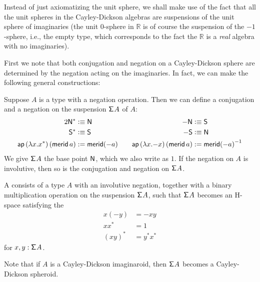 Instead of just axiomatizing the unit sphere, we shall make use of the
fact that all the unit spheres in the Cayley-Dickson algebras are
suspensions of the unit sphere of imaginaries (the unit $0$-sphere in
$\mathbb R$ is of course the suspension of the $-1$-sphere, i.e., the
empty type, which corresponds to the fact the $\mathbb R$ is a
\emph{real} algebra with no imaginaries).

First we note that both conjugation and negation on a Cayley-Dickson
sphere are determined by the negation acting on the imaginaries. In
fact, we can make the following general constructions:
\begin{defn}
  Suppose $A$ is a type with a negation operation. Then we can define a
  conjugation and a negation on the suspension $\mathsf{\Sigma}^{} A$ of $A$:
  \begin{alignat*}2
    \north^* &\defeq \north &   -\north &\defeq \south \\
    \south^* &\defeq \south &   -\south &\defeq \north \\
    \mathsf{ap}\,(\lambda x. x^*)\,(\merid\,a) &:= \merid(-a) &\quad
    \mathsf{ap}\,(\lambda x. {-x})\,(\merid\,a)    &:= \rev{\merid(-a)}
  \end{alignat*}
  We give $\mathsf{\Sigma}^{} A$ the base point $\mathsf{N}$, which we also write as
  $1$. If the negation on $A$ is involutive, then so is the
  conjugation and negation on $\mathsf{\Sigma}^{} A$.
\end{defn}

\begin{defn}
  A  consists of a type $A$ with an
  involutive negation, together with a binary multiplication operation
  on the suspension $\mathsf{\Sigma}^{} A$, such that $\mathsf{\Sigma}^{} A$ becomes an H-space satisfying
  the 
  \begin{align*}
    x(-y) &= -xy \\
    xx^* & =1 \\
    (xy)^* &= y^*x^*
  \end{align*}
  for $x,y:\mathsf{\Sigma}^{} A$.
\end{defn}
Note that if $A$ is a Cayley-Dickson imaginaroid, then $\mathsf{\Sigma}^{} A$
becomes a Cayley-Dickson spheroid.

